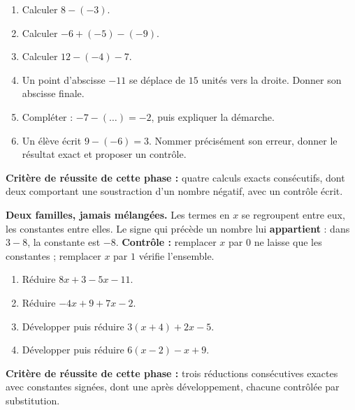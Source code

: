 \documentclass[10pt,a4paper]{article}
\begin{document}
\begin{enumerate}
\needspace{18mm}
\item Calculer $8 - (-3)$.
\needspace{18mm}
\item Calculer $-6 + (-5) - (-9)$.
\needspace{18mm}
\item Calculer $12 - (-4) - 7$.
\needspace{18mm}
\item Un point d'abscisse $-11$ se déplace de $15$ unités vers la droite. Donner son abscisse finale.
\needspace{18mm}
\item Compléter : $-7 - (\ldots) = -2$, puis expliquer la démarche.
\needspace{18mm}
\item Un élève écrit $9 - (-6) = 3$. Nommer précisément son erreur, donner le résultat exact et proposer un contrôle.
\end{enumerate}
\begin{successbox}\textbf{Critère de réussite de cette phase :} quatre calculs exacts consécutifs, dont deux comportant une soustraction d'un nombre négatif, avec un contrôle écrit.\end{successbox}
\certline
\needspace{62mm}\par\vspace{3mm}
\begin{methodbox}
\textbf{Deux familles, jamais mélangées.} Les termes en $x$ se regroupent entre eux, les constantes entre elles.
Le signe qui précède un nombre lui \textbf{appartient} : dans $3 - 8$, la constante est $-8$.
\textbf{Contrôle :} remplacer $x$ par $0$ ne laisse que les constantes ; remplacer $x$ par $1$ vérifie l'ensemble.
\end{methodbox}
\begin{enumerate}
\needspace{18mm}
\item Réduire $8x + 3 - 5x - 11$.
\needspace{18mm}
\item Réduire $-4x + 9 + 7x - 2$.
\needspace{18mm}
\item Développer puis réduire $3(x + 4) + 2x - 5$.
\needspace{18mm}
\item Développer puis réduire $6(x - 2) - x + 9$.
\end{enumerate}
\begin{successbox}\textbf{Critère de réussite de cette phase :} trois réductions consécutives exactes avec constantes signées, dont une après développement, chacune contrôlée par substitution.\end{successbox}
\certline
\needspace{62mm}\par\vspace{3mm}
\end{document}

